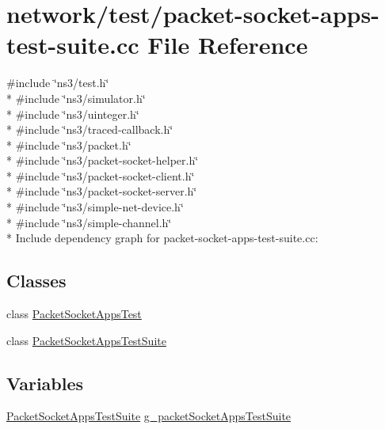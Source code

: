 \hypertarget{packet-socket-apps-test-suite_8cc}{}\section{network/test/packet-\/socket-\/apps-\/test-\/suite.cc File Reference}
\label{packet-socket-apps-test-suite_8cc}
{\ttfamily \#include \char`\"{}ns3/test.\+h\char`\"{}}\\*
{\ttfamily \#include \char`\"{}ns3/simulator.\+h\char`\"{}}\\*
{\ttfamily \#include \char`\"{}ns3/uinteger.\+h\char`\"{}}\\*
{\ttfamily \#include \char`\"{}ns3/traced-\/callback.\+h\char`\"{}}\\*
{\ttfamily \#include \char`\"{}ns3/packet.\+h\char`\"{}}\\*
{\ttfamily \#include \char`\"{}ns3/packet-\/socket-\/helper.\+h\char`\"{}}\\*
{\ttfamily \#include \char`\"{}ns3/packet-\/socket-\/client.\+h\char`\"{}}\\*
{\ttfamily \#include \char`\"{}ns3/packet-\/socket-\/server.\+h\char`\"{}}\\*
{\ttfamily \#include \char`\"{}ns3/simple-\/net-\/device.\+h\char`\"{}}\\*
{\ttfamily \#include \char`\"{}ns3/simple-\/channel.\+h\char`\"{}}\\*
Include dependency graph for packet-\/socket-\/apps-\/test-\/suite.cc\+:
\subsection*{Classes}
\begin{DoxyCompactItemize}
\item 
class \hyperlink{classPacketSocketAppsTest}{Packet\+Socket\+Apps\+Test}
\item 
class \hyperlink{classPacketSocketAppsTestSuite}{Packet\+Socket\+Apps\+Test\+Suite}
\end{DoxyCompactItemize}
\subsection*{Variables}
\begin{DoxyCompactItemize}
\item 
\hyperlink{classPacketSocketAppsTestSuite}{Packet\+Socket\+Apps\+Test\+Suite} \hyperlink{packet-socket-apps-test-suite_8cc_a119bf1d4c3003556c71bf80ab92db37c}{g\+\_\+packet\+Socket\+Apps\+Test\+Suite}
\end{DoxyCompactItemize}


